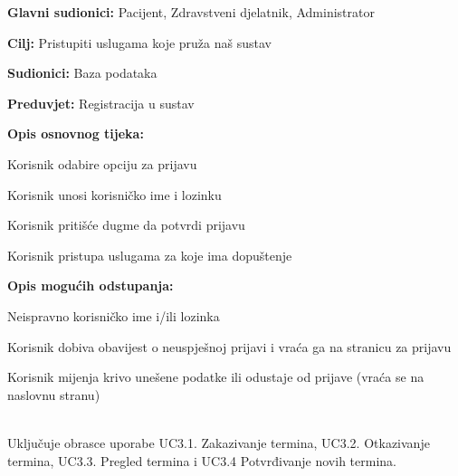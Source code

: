 					\noindent {}
					\begin{packed_item}
						
						\item \textbf{Glavni sudionici: }Pacijent, Zdravstveni djelatnik, Administrator
						\item  \textbf{Cilj:} Pristupiti uslugama koje pruža naš sustav
						\item  \textbf{Sudionici:} Baza podataka
						\item  \textbf{Preduvjet:} Registracija u sustav
						\item  \textbf{Opis osnovnog tijeka:}
						
						\item[] \begin{packed_enum}
							
							\item Korisnik odabire opciju za prijavu
							\item Korisnik unosi korisničko ime i lozinku
							\item Korisnik pritišće dugme da potvrdi prijavu
							\item Korisnik pristupa uslugama za koje ima dopuštenje 
						\end{packed_enum}
						
						\item  \textbf{Opis mogućih odstupanja:}
						
						\item[] \begin{packed_item}
							
							\item[2.a] Neispravno korisničko ime i/ili lozinka
							\item[] \begin{packed_enum}
								
								\item Korisnik dobiva obavijest o neuspješnoj prijavi i vraća ga na stranicu za prijavu
								\item Korisnik mijenja krivo unešene podatke ili odustaje od prijave (vraća se na naslovnu stranu)
								
							\end{packed_enum}
							
						\end{packed_item}
					\end{packed_item}
					
					\noindent {}\\
					Uključuje obrasce uporabe UC3.1. Zakazivanje termina, UC3.2. Otkazivanje termina, UC3.3. Pregled termina i UC3.4 Potvrđivanje novih termina.\\
					
